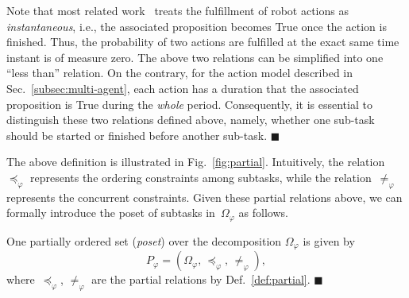 \begin{remark}\label{remark:duration}
Note that most related work~\cite{kantaros2020stylus, guo2015multi,
tumova2016multi, luo2021abstraction,luo2021temporal, sahin2019multirobot, jones2019scratchs}
treats the fulfillment of robot actions as \emph{instantaneous},
i.e., the associated proposition becomes True once the action is finished.
Thus, the probability of two actions are fulfilled at the exact same time instant is of measure zero.
The above two relations can be simplified into one ``less than'' relation. 
On the contrary, for the action model described in Sec.~\ref{subsec:multi-agent},
each action has a duration that the associated proposition is True during the \emph{whole} period.
Consequently, it is essential to distinguish these two relations defined above,
namely, whether one sub-task should be started or finished before another sub-task. 
\hfill  $\blacksquare$
\end{remark}


The above definition is illustrated in Fig.~\ref{fig:partial}.
Intuitively, the relation~$\preceq_{\varphi}$ represents the ordering
constraints among subtasks,
while the relation~$\neq_{\varphi}$ represents the concurrent constraints.
Given these partial relations above, we can formally introduce the poset of subtasks in~$\Omega_{\varphi}$ as follows.


\begin{definition}\label{def:poset}
One partially ordered set (\emph{poset}) over the decomposition $\Omega_{\varphi}$ is given by
\begin{equation}\label{eq:poset}
P_{\varphi} = (\Omega_{\varphi}, \, \preceq_{\varphi}, \, \neq_{\varphi}),
\end{equation}
where~$\preceq_{\varphi}$, $\neq_{\varphi}$ are the partial relations by
Def.~\ref{def:partial}.
\hfill $\blacksquare$
\end{definition}

